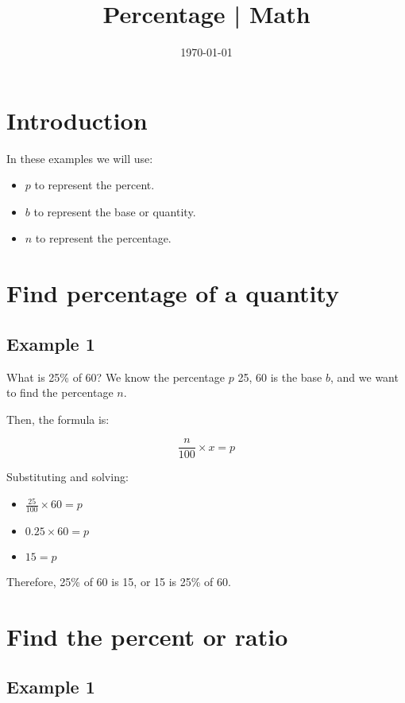 \documentclass[11pt]{article}
\date{\today}
\title{Percentage | Math}
\begin{document}
\maketitle
\tableofcontents


\section{Introduction}
\label{sec:org5feeed2}

In these examples we will use:

\begin{itemize}
\item \(p\) to represent the percent.
\item \(b\) to represent the base or quantity.
\item \(n\) to represent the percentage.
\end{itemize}

\section{Find percentage of a quantity}
\label{sec:org1a88cb1}

\subsection{Example 1}
\label{sec:org4f24d52}

What is 25\% of 60? We know the percentage \(p\) 25, 60 is the base
\(b\), and we want to find the percentage \(n\).

Then, the formula is:

\[\frac{n}{100} \times {x} = p\]

Substituting and solving:

\begin{itemize}
\item \(\frac{25}{100}\times{60}=p\)
\item \(0.25\times{60}=p\)
\item \(15=p\)
\end{itemize}

Therefore, 25\% of 60 is 15, or 15 is 25\% of 60.

\section{Find the percent or ratio}
\label{sec:orge2c15b9}

\subsection{Example 1}
\label{sec:orgf98ea66}
\end{document}
